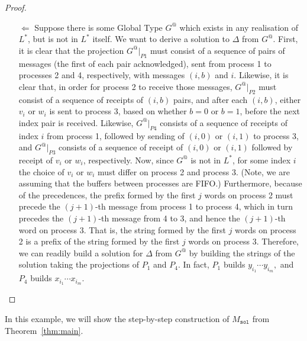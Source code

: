 \begin{proof}
\begin{itemize}
		\item[$\Leftarrow$]
		      Suppose there is some Global Type $G^@$ which
		      exists in any realisation of $L^*$, but is not in $L^*$ itself. We want
		      to derive a solution to $\Delta$ from $G^@$.
		      First, it is clear that the projection $G^@|_{P1}$ must consist of a sequence
		      of pairs of messages (the first of each pair acknowledged), sent from
		      process 1 to processes 2 and 4, respectively, with messages $(i, b)$ and $i$.
		      Likewise, it is clear that, in order for process 2 to receive those messages,
		      $G^@|_{P2}$ must consist of a sequence of receipts of $(i, b)$ pairs, and after
		      each $(i, b)$, either $v_i$ or $w_i$ is sent to process 3, based on whether
		      $b = 0$ or $b = 1$, before the next index pair is received.
		      Likewise, $G^@|_{P4}$ consists of a sequence of receipts of index $i$ from
		      process 1, followed by sending of $(i, 0)$ or $(i, 1)$ to process 3, and
		      $G^@|_{P3}$ consists of a sequence of receipt of $(i, 0)$ or $(i, 1)$ followed
		      by receipt of $v_i$ or $w_i$, respectively.
		      Now, since $G^@$ is not in $L^*$, for some index $i$ the choice of $v_i$ or
		      $w_i$ must differ on process 2 and process 3. (Note, we are assuming that
		      the buffers between processes are FIFO.)
		      Furthermore, because of the precedences, the prefix formed by the first
		      $j$ words on process 2 must precede the $(j + 1)$-th message from
		      process 1 to process 4, which in turn precedes the $(j + 1)$-th message
		      from 4 to 3, and hence the $(j + 1)$-th word on process 3. That is, the
		      string formed by the first $j$ words on process 2 is a prefix of the string
		      formed by the first $j$ words on process 3. Therefore, we can readily
		      build a solution for $\Delta$ from $G^@$ by building the strings of the solution
		      taking the projections of $P_1$ and $P_4$. In fact, $P_1$ builds 
			  $y_{i_1}\cdots y_{i_m},$ and $P_4$ builds $x_{i_1}\cdots x_{i_m}$.

	\end{itemize}

\end{proof}

In this example, we will show the step-by-step construction 
of $M_{\texttt{sol}}$ from Theorem~\ref{thm:main}.

\bigskip

